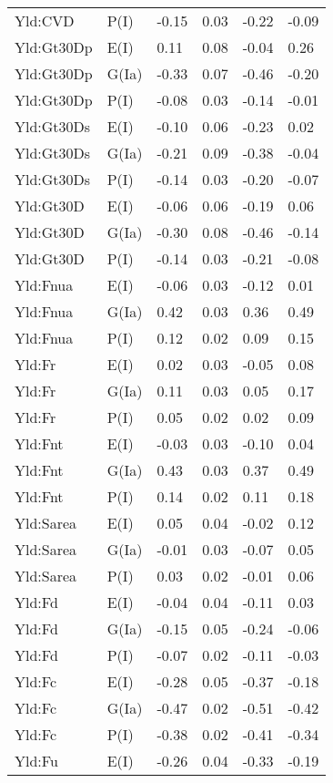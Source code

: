 \begin{center}
\begin{longtable}{|p{1.1in}|p{0.7in}|p{0.7in}|p{0.6in}|p{0.6in}|p{0.6in}|}
  Yld:CVD & P(I) & -0.15 & 0.03 & -0.22 & -0.09 \\ 
  Yld:Gt30Dp & E(I) & 0.11 & 0.08 & -0.04 & 0.26 \\ 
  Yld:Gt30Dp & G(Ia) & -0.33 & 0.07 & -0.46 & -0.20 \\ 
  Yld:Gt30Dp & P(I) & -0.08 & 0.03 & -0.14 & -0.01 \\ 
  Yld:Gt30Ds & E(I) & -0.10 & 0.06 & -0.23 & 0.02 \\ 
  Yld:Gt30Ds & G(Ia) & -0.21 & 0.09 & -0.38 & -0.04 \\ 
  Yld:Gt30Ds & P(I) & -0.14 & 0.03 & -0.20 & -0.07 \\ 
  Yld:Gt30D & E(I) & -0.06 & 0.06 & -0.19 & 0.06 \\ 
  Yld:Gt30D & G(Ia) & -0.30 & 0.08 & -0.46 & -0.14 \\ 
  Yld:Gt30D & P(I) & -0.14 & 0.03 & -0.21 & -0.08 \\ 
  Yld:Fnua & E(I) & -0.06 & 0.03 & -0.12 & 0.01 \\ 
  Yld:Fnua & G(Ia) & 0.42 & 0.03 & 0.36 & 0.49 \\ 
  Yld:Fnua & P(I) & 0.12 & 0.02 & 0.09 & 0.15 \\ 
  Yld:Fr & E(I) & 0.02 & 0.03 & -0.05 & 0.08 \\ 
  Yld:Fr & G(Ia) & 0.11 & 0.03 & 0.05 & 0.17 \\ 
  Yld:Fr & P(I) & 0.05 & 0.02 & 0.02 & 0.09 \\ 
  Yld:Fnt & E(I) & -0.03 & 0.03 & -0.10 & 0.04 \\ 
  Yld:Fnt & G(Ia) & 0.43 & 0.03 & 0.37 & 0.49 \\ 
  Yld:Fnt & P(I) & 0.14 & 0.02 & 0.11 & 0.18 \\ 
  Yld:Sarea & E(I) & 0.05 & 0.04 & -0.02 & 0.12 \\ 
  Yld:Sarea & G(Ia) & -0.01 & 0.03 & -0.07 & 0.05 \\ 
  Yld:Sarea & P(I) & 0.03 & 0.02 & -0.01 & 0.06 \\ 
  Yld:Fd & E(I) & -0.04 & 0.04 & -0.11 & 0.03 \\ 
  Yld:Fd & G(Ia) & -0.15 & 0.05 & -0.24 & -0.06 \\ 
  Yld:Fd & P(I) & -0.07 & 0.02 & -0.11 & -0.03 \\ 
  Yld:Fc & E(I) & -0.28 & 0.05 & -0.37 & -0.18 \\ 
  Yld:Fc & G(Ia) & -0.47 & 0.02 & -0.51 & -0.42 \\ 
  Yld:Fc & P(I) & -0.38 & 0.02 & -0.41 & -0.34 \\ 
  Yld:Fu & E(I) & -0.26 & 0.04 & -0.33 & -0.19 \\ 

\end{longtable}
\end{center}
